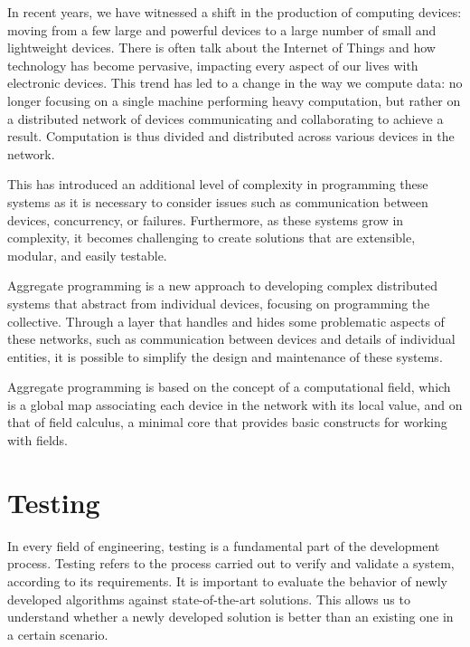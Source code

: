 \documentclass[12pt,a4paper,openright,twoside]{book}
\begin{document}
In recent years, we have witnessed a shift in the production of computing devices: moving from a few large and powerful devices to a large number of small and lightweight devices.
There is often talk about the Internet of Things and how technology has become pervasive, impacting every aspect of our lives with electronic devices.
This trend has led to a change in the way we compute data: no longer focusing on a single machine performing heavy computation, but rather on a distributed network of devices communicating and collaborating to achieve a result.
Computation is thus divided and distributed across various devices in the network.

This has introduced an additional level of complexity in programming these systems as it is necessary to consider issues such as communication between devices,
concurrency, or failures. Furthermore, as these systems grow in complexity, it becomes challenging to create solutions that are extensible, modular, and easily testable. \cite{DBLP:conf/ecoop/CasadeiV16}

Aggregate programming is a new approach to developing complex distributed systems that abstract from individual devices, focusing on programming the collective.
Through a layer that handles and hides some problematic aspects of these networks, such as communication between devices and details of individual entities,
it is possible to simplify the design and maintenance of these systems. \cite{DBLP:journals/computer/BealPV15, DBLP:conf/sfm/BealV16}

Aggregate programming is based on the concept of a computational field, which is a global map associating each device in the network with its local value,
and on that of field calculus, a minimal core that provides basic constructs for working with fields. \cite{DBLP:journals/corr/ViroliADPB16}

\section{Testing}

In every field of engineering, testing is a fundamental part of the development process.
Testing refers to the process carried out to verify and validate a system, according to its requirements. \cite{Spillner2011}
It is important to evaluate the behavior of newly developed algorithms against state-of-the-art solutions.
This allows us to understand whether a newly developed solution is better than an existing one in a certain scenario. \\
\end{document}
